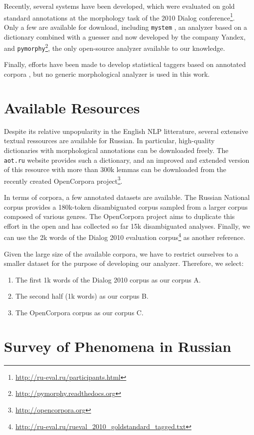 \documentclass[11pt,letterpaper]{article}
\begin{document}
Recently, several systems have been developed, which were evaluated on gold standard annotations at the morphology task of the 2010 Dialog conference\footnote{\url{http://ru-eval.ru/participants.html}}. Only a few are available for download, including \texttt{mystem} \cite{mystem}, an analyzer based on a dictionary combined with a guesser and now developed by the company Yandex, and \texttt{pymorphy}\footnote{\url{http://pymorphy.readthedocs.org}}, the only open-source analyzer available to our knowledge.

Finally, efforts have been made to develop statistical taggers based on annotated corpora \cite{sharoff2008}, but no generic morphological analyzer is used in this work.

\section{Available Resources}
Despite its relative unpopularity in the English NLP litterature, several extensive textual ressources are available for Russian. In particular, high-quality dictionaries with morphological annotations can be downloaded freely. The \texttt{aot.ru} website provides such a dictionary, and an improved and extended version of this resource with more than 300k lemmas can be downloaded from the recently created OpenCorpora project\footnote{\url{http://opencorpora.org}}.

In terms of corpora, a few annotated datasets are available. The Russian National corpus provides a 180k-token disambiguated corpus sampled from a larger corpus composed of various genres. The OpenCorpora project aims to duplicate this effort in the open and has collected so far 15k disambiguated analyses. Finally, we can use the 2k words of the Dialog 2010 evaluation corpus\footnote{\url{http://ru-eval.ru/rueval_2010_goldstandard_tagged.txt}} as another reference.

Given the large size of the available corpora, we have to restrict ourselves to a smaller dataset for the purpose of developing our analyzer. Therefore, we select:
\begin{enumerate}
    \item The first 1k words of the Dialog 2010 corpus as our corpus A.
    \item The second half (1k words) as our corpus B.
    \item The OpenCorpora corpus as our corpus C.
\end{enumerate}

\section{Survey of Phenomena in Russian}
\end{document}
